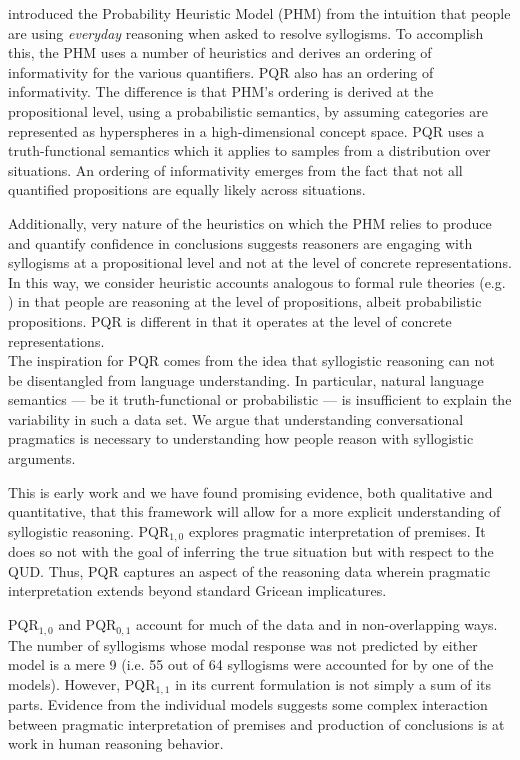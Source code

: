 \documentclass[10pt,letterpaper]{article}
\begin{document}
 introduced the Probability Heuristic Model (PHM) from the intuition that people are using \emph{everyday} reasoning when asked to resolve syllogisms. To accomplish this, the PHM uses a number of heuristics and derives an ordering of informativity for the various quantifiers. PQR also has an ordering of informativity. The difference is that PHM's ordering is derived at the propositional level, using a probabilistic semantics, by assuming categories are represented as hyperspheres in a high-dimensional concept space. PQR uses a truth-functional semantics which it applies to samples from a distribution over situations. An ordering of informativity emerges from the fact that not all quantified propositions are equally likely across situations.

Additionally, very nature of the heuristics on which the PHM relies to produce and quantify confidence in conclusions suggests reasoners are engaging with syllogisms at a propositional level and not at the level of concrete representations. In this way, we consider heuristic accounts analogous to formal rule theories (e.g. ) in that people are reasoning at the level of propositions, albeit probabilistic propositions. PQR is different in that it operates at the level of concrete representations.
\\

The inspiration for PQR comes from the idea that syllogistic reasoning can not be disentangled from language understanding. In particular, natural language semantics --- be it truth-functional or probabilistic --- is insufficient to explain the variability in such a data set. We argue that understanding conversational pragmatics is necessary to understanding how people reason with syllogistic arguments. 

This is early work and we have found promising evidence, both qualitative and quantitative, that this framework will allow for a more explicit understanding of syllogistic reasoning. PQR$_{1,0}$ explores pragmatic interpretation of premises. It does so not with the goal of inferring the true situation but with respect to the QUD. Thus, PQR captures an aspect of the reasoning data wherein pragmatic interpretation extends beyond standard Gricean implicatures.

PQR$_{1,0}$ and PQR$_{0,1}$ account for much of the data and in non-overlapping ways. The number of syllogisms whose modal response was not predicted by either model is a mere 9 (i.e. 55 out of 64 syllogisms were accounted for by one of the models). However, PQR$_{1,1}$ in its current formulation is not simply a sum of its parts. Evidence from the individual models suggests some complex interaction between pragmatic interpretation of premises and production of conclusions is at work in human reasoning behavior. 
\end{document}

